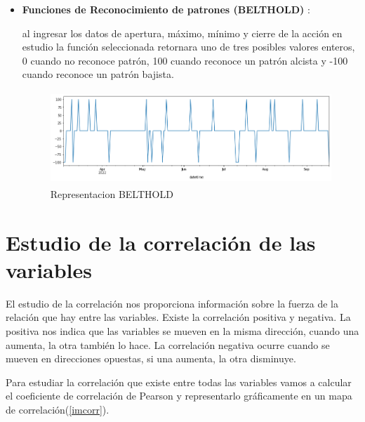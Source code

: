 \documentclass[11pt]{article} %
\begin{document}
\begin{itemize}
	\item \textbf{Funciones de Reconocimiento de patrones (BELTHOLD) } :	

al ingresar los datos de apertura, máximo, mínimo y cierre de la acción en estudio la función seleccionada retornara uno de tres posibles valores enteros, 0 cuando no reconoce patrón, 100 cuando reconoce un patrón alcista y -100 cuando reconoce un patrón bajista.

\begin{center}
	\begin{figure}[htb]
		\centering
		\includegraphics[width=12cm, height=3.5cm]{belthold.png}
		\caption{Representacion BELTHOLD}
	\end{figure}
\end{center}


\end{itemize}


\newpage
\section{Estudio de la correlación de las variables}

El estudio de la correlación nos proporciona información sobre la fuerza de la relación que hay entre las variables. Existe la correlación positiva y negativa. La positiva nos indica que las variables se mueven en la misma dirección, cuando una aumenta, la otra también lo hace. La correlación negativa ocurre cuando se mueven en direcciones opuestas, si una aumenta, la otra disminuye. 

Para estudiar la correlación que existe entre todas las variables vamos a calcular el coeficiente de correlación de Pearson y representarlo gráficamente en un mapa de correlación(\ref{imcorr}).
\end{document}
